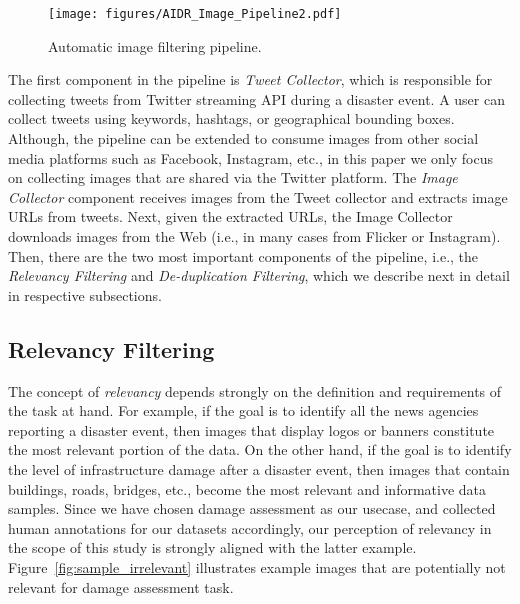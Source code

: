 \documentclass{iscram}
\begin{document}
\begin{figure}[!htb]
\centering \texttt{[image: figures/AIDR\_Image\_Pipeline2.pdf]}
\caption{Automatic image filtering pipeline.
}
\label{fig:pipeline}
\end{figure}The first component in the pipeline is \emph{Tweet Collector}, which is responsible for collecting tweets from Twitter streaming API during a disaster event. A user can collect tweets using keywords, hashtags, or geographical bounding boxes. Although, the pipeline can be extended to consume images from other social media platforms such as Facebook, Instagram, etc., in this paper we only focus on collecting images that are shared via the Twitter platform. The \emph{Image Collector} component receives images from the Tweet collector and extracts image URLs from tweets. Next, given the extracted URLs, the Image Collector downloads images from the Web (i.e., in many cases from Flicker or Instagram). Then, there are the two most important components of the pipeline, i.e., the \emph{Relevancy Filtering} and \emph{De-duplication Filtering}, which we describe next in detail in respective subsections.

\subsection{Relevancy Filtering}%

The concept of \emph{relevancy} depends strongly on the definition and requirements of the task at hand. For example, if the goal is to identify all the news agencies reporting a disaster event, then images that display logos or banners constitute the most relevant portion of the data. On the other hand, if the goal is to identify the level of infrastructure damage after a disaster event, then images that contain buildings, roads, bridges, etc., become the most relevant and informative data samples. Since we have chosen damage assessment as our usecase, and collected human annotations for our datasets accordingly, our perception of relevancy in the scope of this study is strongly aligned with the latter example. Figure~\ref{fig:sample_irrelevant} illustrates example images that are potentially not relevant for damage assessment task.
\end{document}
